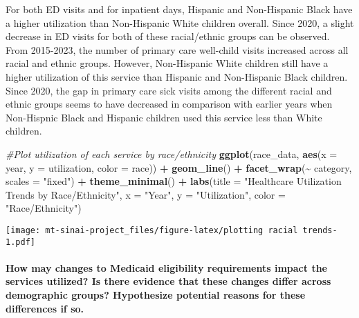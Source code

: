 \documentclass[
]{article}
\newenvironment{Shaded}{\begin{snugshade}}{\end{snugshade}}
\newcommand{\AttributeTok}[1]{\textcolor[rgb]{0.13,0.29,0.53}{#1}}
\newcommand{\CommentTok}[1]{\textcolor[rgb]{0.56,0.35,0.01}{\textit{#1}}}
\newcommand{\FunctionTok}[1]{\textcolor[rgb]{0.13,0.29,0.53}{\textbf{#1}}}
\newcommand{\NormalTok}[1]{#1}
\newcommand{\SpecialCharTok}[1]{\textcolor[rgb]{0.81,0.36,0.00}{\textbf{#1}}}
\newcommand{\StringTok}[1]{\textcolor[rgb]{0.31,0.60,0.02}{#1}}
\begin{document}
For both ED visits and for inpatient days, Hispanic and Non-Hispanic
Black have a higher utilization than Non-Hispanic White children
overall. Since 2020, a slight decrease in ED visits for both of these
racial/ethnic groups can be observed. From 2015-2023, the number of
primary care well-child visits increased across all racial and ethnic
groups. However, Non-Hispanic White children still have a higher
utilization of this service than Hispanic and Non-Hispanic Black
children. Since 2020, the gap in primary care sick visits among the
different racial and ethnic groups seems to have decreased in comparison
with earlier years when Non-Hispnic Black and Hispanic children used
this service less than White children.

\begin{Shaded}
\begin{Highlighting}[]
\CommentTok{\#Plot utilization of each service by race/ethnicity}
\FunctionTok{ggplot}\NormalTok{(race\_data, }\FunctionTok{aes}\NormalTok{(}\AttributeTok{x =}\NormalTok{ year, }\AttributeTok{y =}\NormalTok{ utilization, }\AttributeTok{color =}\NormalTok{ race)) }\SpecialCharTok{+}
  \FunctionTok{geom\_line}\NormalTok{() }\SpecialCharTok{+}
  \FunctionTok{facet\_wrap}\NormalTok{(}\SpecialCharTok{\textasciitilde{}}\NormalTok{ category, }\AttributeTok{scales =} \StringTok{"fixed"}\NormalTok{) }\SpecialCharTok{+}
  \FunctionTok{theme\_minimal}\NormalTok{() }\SpecialCharTok{+}
  \FunctionTok{labs}\NormalTok{(}\AttributeTok{title =} \StringTok{"Healthcare Utilization Trends by Race/Ethnicity"}\NormalTok{, }\AttributeTok{x =} \StringTok{"Year"}\NormalTok{, }\AttributeTok{y =} \StringTok{"Utilization"}\NormalTok{, }\AttributeTok{color =} \StringTok{"Race/Ethnicity"}\NormalTok{)}
\end{Highlighting}
\end{Shaded}

\texttt{[image: mt-sinai-project\_files/figure-latex/plotting racial trends-1.pdf]}

\hypertarget{how-may-changes-to-medicaid-eligibility-requirements-impact-the-services-utilized-is-there-evidence-that-these-changes-differ-across-demographic-groups-hypothesize-potential-reasons-for-these-differences-if-so.}{%
\paragraph{How may changes to Medicaid eligibility requirements impact
the services utilized? Is there evidence that these changes differ
across demographic groups? Hypothesize potential reasons for these
differences if
so.}\label{how-may-changes-to-medicaid-eligibility-requirements-impact-the-services-utilized-is-there-evidence-that-these-changes-differ-across-demographic-groups-hypothesize-potential-reasons-for-these-differences-if-so.}}
\end{document}
